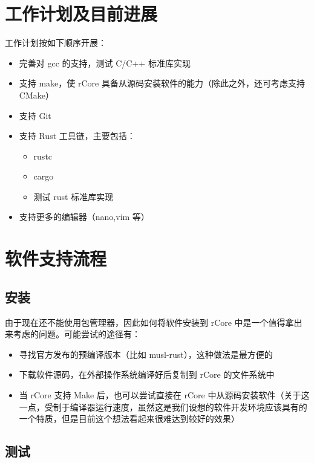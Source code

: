 \documentclass{article}
\begin{document}
    \section{工作计划及目前进展}

    工作计划按如下顺序开展：

    \begin{itemize}
        \item 完善对 gcc 的支持，测试 C/C++ 标准库实现
        \item 支持 make，使 rCore 具备从源码安装软件的能力（除此之外，还可考虑支持 CMake）
        \item 支持 Git
        \item 支持 Rust 工具链，主要包括：
        \begin{itemize}
            \item rustc
            \item cargo
            \item 测试 rust 标准库实现
        \end{itemize}
        \item 支持更多的编辑器（nano,vim 等）
    \end{itemize}

    \section{软件支持流程}
    \subsection{安装}

    由于现在还不能使用包管理器，因此如何将软件安装到 rCore 中是一个值得拿出来考虑的问题。可能尝试的途径有：
    \begin{itemize}
        \item 寻找官方发布的预编译版本（比如 musl-rust），这种做法是最方便的
        \item 下载软件源码，在外部操作系统编译好后复制到 rCore 的文件系统中
        \item 当 rCore 支持 Make 后，也可以尝试直接在 rCore 中从源码安装软件（关于这一点，受制于编译器运行速度，虽然这是我们设想的软件开发环境应该具有的一个特质，但是目前这个想法看起来很难达到较好的效果）        
    \end{itemize}

    \subsection{测试}
\end{document}
